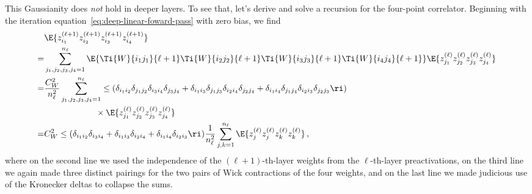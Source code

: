This Gaussianity does \emph{not} hold in deeper layers.  To see that, let's derive and solve a recursion for the four-point correlator. 
Beginning with the iteration equation~\eqref{eq:deep-linear-foward-pass} with zero bias, we find
\begin{align}\label{eq:deep-linear-four-point-a}
&\E{z_{i_1}^{(\ell+1)}z_{i_2}^{(\ell+1)}z_{i_3}^{(\ell+1)}z_{i_4}^{(\ell+1)}}\, \\
=&\sum_{j_1,j_2,j_3,j_4=1}^{n_{\ell}}\E{\Ti{W}{i_1j_1}{\ell+1}\Ti{W}{i_2j_2}{\ell+1}\Ti{W}{i_3j_3}{\ell+1}\Ti{W}{i_4j_4}{\ell+1}}\E{z_{j_1}^{(\ell)}z_{j_2}^{(\ell)}z_{j_3}^{(\ell)}z_{j_4}^{(\ell)}}\, \nonumber\\
=&\frac{C_W^2}{n_{\ell}^2}\sum_{j_1,j_2,j_3,j_4=1}^{n_{\ell}}\le(\delta_{i_1i_2}\delta_{j_1j_2}\delta_{i_3i_4}\delta_{j_3j_4}+\delta_{i_1i_3}\delta_{j_1j_3}\delta_{i_2i_4}\delta_{j_2j_4}+\delta_{i_1i_4}\delta_{j_1j_4}\delta_{i_2i_3}\delta_{j_2j_3}\ri)\, \nonumber\\
&\quad \quad \quad \quad \quad \quad \times \E{z_{j_1}^{(\ell)}z_{j_2}^{(\ell)}z_{j_3}^{(\ell)}z_{j_4}^{(\ell)}}\,  \nonumber \\
=&C_W^2\le(\delta_{i_1i_2}\delta_{i_3i_4}+\delta_{i_1i_3}\delta_{i_2i_4}+\delta_{i_1i_4}\delta_{i_2i_3}\ri)\frac{1}{n_{\ell}^2}\sum_{j,k=1}^{n_{\ell}}\E{z_{j}^{(\ell)}z_{j}^{(\ell)}z_{k}^{(\ell)}z_{k}^{(\ell)}}\, ,\nonumber
\end{align}
where on the second line we used the independence of the $(\ell+1)$-th-layer weights from the $\ell$-th-layer preactivations, 
on the third line we again made three distinct pairings for the two pairs of Wick contractions of 
the four weights, and on the last line we made judicious use of the Kronecker deltas to collapse the sums.  

